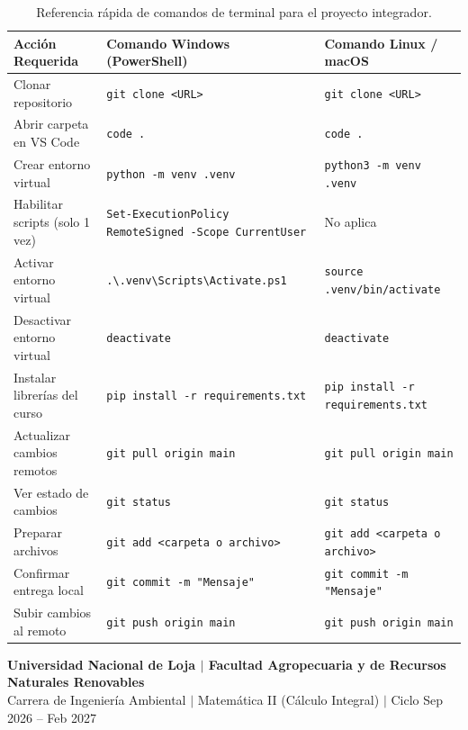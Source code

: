 \documentclass[11pt,a4paper]{article}
\begin{document}
\begin{table}[h!]
\centering
\small
\renewcommand{\arraystretch}{1.20}
\begin{tabularx}{\textwidth}{L{4.2cm} L{5.5cm} Y}
\toprule
\textbf{Acción Requerida} & \textbf{Comando Windows (PowerShell)} & \textbf{Comando Linux / macOS} \\
\midrule
Clonar repositorio & \texttt{git clone <URL>} & \texttt{git clone <URL>} \\
Abrir carpeta en VS Code & \texttt{code .} & \texttt{code .} \\
Crear entorno virtual & \texttt{python -m venv .venv} & \texttt{python3 -m venv .venv} \\
Habilitar scripts (solo 1 vez) & \texttt{Set-ExecutionPolicy RemoteSigned -Scope CurrentUser} & No aplica \\
Activar entorno virtual & \texttt{.\textbackslash .venv\textbackslash Scripts\textbackslash Activate.ps1} & \texttt{source .venv/bin/activate} \\
Desactivar entorno virtual & \texttt{deactivate} & \texttt{deactivate} \\
Instalar librerías del curso & \texttt{pip install -r requirements.txt} & \texttt{pip install -r requirements.txt} \\
Actualizar cambios remotos & \texttt{git pull origin main} & \texttt{git pull origin main} \\
Ver estado de cambios & \texttt{git status} & \texttt{git status} \\
Preparar archivos & \texttt{git add <carpeta o archivo>} & \texttt{git add <carpeta o archivo>} \\
Confirmar entrega local & \texttt{git commit -m "Mensaje"} & \texttt{git commit -m "Mensaje"} \\
Subir cambios al remoto & \texttt{git push origin main} & \texttt{git push origin main} \\
\bottomrule
\end{tabularx}
\caption{Referencia rápida de comandos de terminal para el proyecto integrador.}
\label{tab:cheatsheet}
\end{table}

\vfill
\begin{center}
  \footnotesize\textbf{Universidad Nacional de Loja $\vert$ Facultad Agropecuaria y de Recursos Naturales Renovables}\\
  \footnotesize Carrera de Ingeniería Ambiental $\vert$ Matemática II (Cálculo Integral) $\vert$ Ciclo Sep 2026 -- Feb 2027
\end{center}
\end{document}
